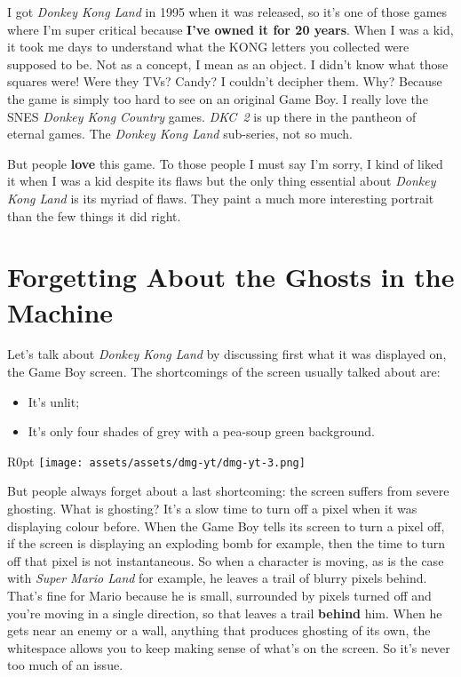 \documentclass{book}
\begin{document}
I got \emph{Donkey Kong Land} in 1995 when it was released, so it’s one of those games where I’m super critical because \textbf{I’ve owned it for 20 years}. When I was a kid, it took me days to understand what the KONG letters you collected were supposed to be. Not as a concept, I mean as an object. I didn’t know what those squares were! Were they TVs? Candy? I couldn’t decipher them. Why? Because the game is simply too hard to see on an original Game Boy. I really love the SNES \emph{Donkey Kong Country} games. \emph{DKC 2} is up there in the pantheon of eternal games. The \emph{Donkey Kong Land} sub-series, not so much.

But people \textbf{love} this game. To those people I must say I’m sorry, I kind of liked it when I was a kid despite its flaws but the only thing essential about \emph{Donkey Kong Land} is its myriad of flaws. They paint a much more interesting portrait than the few things it did right.

\FloatBarrier\needspace{5pt}\section*{Forgetting About the Ghosts in the Machine}\nopagebreak[4]

Let’s talk about \emph{Donkey Kong Land} by discussing first what it was displayed on, the Game Boy screen. The shortcomings of the screen usually talked about are:

\begin{itemize} \setlength\itemsep{-0.4em}
\item It’s unlit;
\item It’s only four shades of grey with a pea-soup green background.
\end{itemize}\noindent

\begin{wrapfigure}{R}{0pt} \texttt{[image: assets/assets/dmg-yt/dmg-yt-3.png]}\end{wrapfigure}
But people always forget about a last shortcoming: the screen suffers from severe ghosting. What is ghosting? It’s a slow time to turn off a pixel when it was displaying colour before. When the Game Boy tells its screen to turn a pixel off, if the screen is displaying an exploding bomb for example, then the time to turn off that pixel is not instantaneous. So when a character is moving, as is the case with \emph{Super Mario Land} for example, he leaves a trail of blurry pixels behind. That’s fine for Mario because he is small, surrounded by pixels turned off and you’re moving in a single direction, so that leaves a trail \textbf{behind} him. When he gets near an enemy or a wall, anything that produces ghosting of its own, the whitespace allows you to keep making sense of what’s on the screen. So it’s never too much of an issue.
\end{document}
